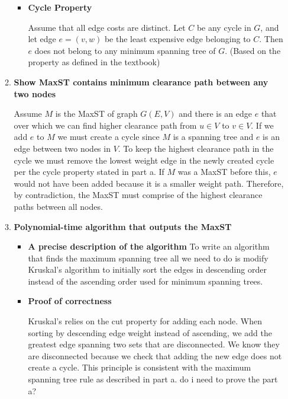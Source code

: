 \documentclass[letterpaper,11pt]{article}
\begin{document}
\begin{enumerate}
\begin{enumerate}
\begin{itemize}
                \item \textbf{Cycle Property}

                    Assume that all edge costs are distinct. Let $C$ be any 
                    cycle in $G$, and let edge $e = (v, w)$ be the least 
                    expensive edge belonging to $C$. Then $e$ does not belong 
                    to any minimum spanning tree of $G$. (Based on the 
                    property as defined in the textbook)


            \end{itemize}
        \item \textbf{Show MaxST contains minimum clearance path between any two 
            nodes}
            
            Assume $M$ is the MaxST of graph $G(E, V)$ and there is an edge $e$ 
            that over which we can find  higher clearance path from $u \in V$ 
            to $v \in V$. If we add $e$ to $M$ we must create a cycle since 
            $M$ is a spanning tree and $e$ is an edge between two nodes in 
            $V$. To keep the highest clearance path in the cycle we must remove 
            the lowest weight edge in the newly created cycle per the cycle 
            property stated in part a. If $M$ was a MaxST before this, $e$ 
            would not have been added because it is a smaller weight path. 
            Therefore, by contradiction, the MaxST must comprise of the highest 
            clearance paths between all nodes. 

        \item \textbf{Polynomial-time algorithm that outputs the MaxST}

            \begin{itemize}
                \item \textbf{A precise description of the algorithm}
                    To write an algorithm that finds the maximum spanning tree
                    all we need to do is modify Kruskal's algorithm to 
                    initially sort the edges in descending order instead of the 
                    ascending order used for minimum spanning trees.

                \item \textbf{Proof of correctness}

                    Kruskal's relies on the cut property for adding each node. 
                    When sorting by descending edge weight instead of 
                    ascending, we add the greatest edge spanning two sets that
                    are disconnected. We know they are disconnected because we 
                    check that adding the new edge does not create a cycle. This
                    principle is consistent with the maximum spanning tree rule
                    as described in part a. 
                    \color{red} do i need to prove the part a? \color{teal}


\end{itemize}
\end{enumerate}
\end{enumerate}
\end{document}
